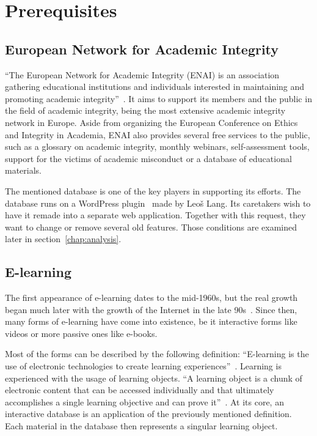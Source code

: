 \documentclass[
  digital,     %
  oneside,     %
  nosansbold,  %
  colorbold, %
  lof,         %
  lot,         %
]{fithesis4}
\begin{document}
\chapter{Prerequisites}

\section{European Network for Academic Integrity}

“The European Network for Academic Integrity (ENAI) is an association gathering
educational institutions and individuals interested in maintaining and promoting
academic integrity”~\cite{enai_about}. It aims to support its members and
the public in the field of academic integrity, being the most extensive academic
integrity network in Europe. Aside from organizing the European Conference on Ethics
and Integrity in Academia, ENAI also provides several free services to the public,
such as a glossary on academic integrity, monthly webinars, self-assessment tools,
support for the victims of academic misconduct or a database of educational materials.

The mentioned database is one of the key players in supporting its efforts.
The database runs on a WordPress plugin~\cite{lang18} made by Leoš Lang.
Its caretakers wish to have it remade into a separate web application. Together
with this request, they want to change or remove several old features. Those
conditions are examined later in section~\ref{chap:analysis}.

\section{E-learning}

The first appearance of \mbox{e-learning} dates to the \mbox{mid-1960s}, but
the real growth began much later with the growth of the Internet in the late
90s~\cite{research_e-learning}. Since then, many forms of \mbox{e-learning}
have come into existence, be it interactive forms like videos or more passive
ones like \mbox{e-books}.

Most of the forms can be described by the following definition:  “E-learning is the use
of electronic technologies to create learning experiences”~\parencite[page.~1]{horton11}.
Learning is experienced with the usage of learning objects. “A learning object is a chunk
of electronic content that can be accessed individually and that ultimately accomplishes
a single learning objective and can prove it”~\parencite[page.~47]{horton11}. At its core,
an interactive database is an application of the previously mentioned definition.
Each material in the database then represents a singular learning object.
\end{document}

